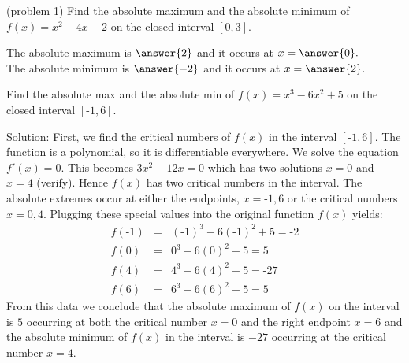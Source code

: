 \documentclass[handout]{ximera}
\begin{document}
\begin{problem}(problem 1)
Find the absolute maximum and the absolute minimum of $f(x) = x^2 - 4x + 2$
on the closed interval $[0, 3]$.

The absolute maximum is $\answer{2}$ and it occurs at $x = \answer{0}.$\\
The absolute minimum is $\answer{-2}$ and it occurs at $x = \answer{2}.$ 

\end{problem}



\begin{example}[example 2]
 Find the absolute max and the absolute min of $f(x) = x^3 - 6x^2 + 5$ on the closed interval $[\text{-}1, 6]$.

Solution:  First, we find the critical numbers of $f(x)$ in the interval $[\text{-}1, 6]$. 
The function is a polynomial, so it is differentiable everywhere.  
We solve the equation $f'(x) =0$.  This becomes $3x^2 -12x= 0$ which has two solutions $x=0$ and $x = 4$ (verify).
Hence $f(x)$ has two critical numbers in the interval.
The absolute extremes occur at either the endpoints, $x=\text{-}1, 6$ or the critical numbers $x = 0, 4$.  
Plugging these special values into the original function $f(x)$ yields:
\begin{eqnarray*}
f(\text{-}1) &=& (\text{-}1)^3 -6(\text{-}1)^2 + 5 = \text{-}2\\
f(0) &=& 0^3 - 6(0)^2 + 5 =5\\
f(4) &=& 4^3 - 6(4)^2 + 5 = \text{-}27\\
f(6) &=& 6^3 - 6(6)^2 + 5 = 5
\end{eqnarray*}
From this data we conclude that the absolute maximum of $f(x)$ on the interval is $5$ occurring 
at both the critical number $x = 0$ and the right endpoint $x = 6$ and 
the absolute minimum of $f(x)$ in the interval is $-27$
occurring at the critical number $x = 4$.
\begin{image}
\end{image}
\end{example}
\end{document}
